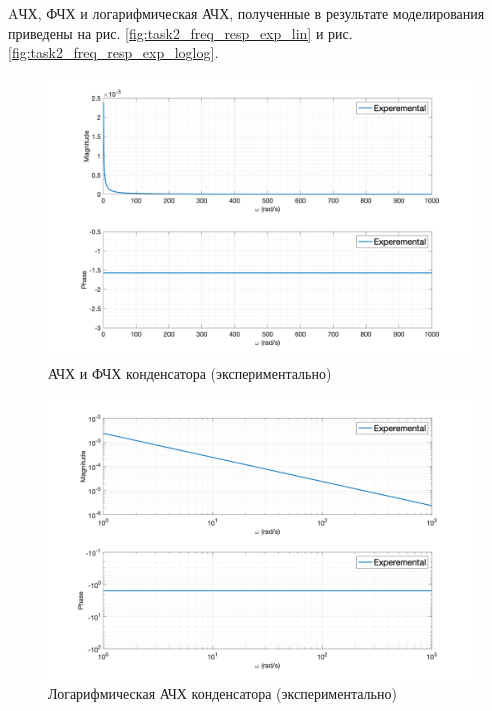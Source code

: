AЧХ, ФЧХ и логарифмическая АЧХ, полученные в результате моделирования приведены на рис. \ref{fig:task2_freq_resp_exp_lin} и рис. \ref{fig:task2_freq_resp_exp_loglog}.
\begin{figure}[ht!]
    \centering
    \includegraphics[width=\textwidth]{media/plots/task3_freq_resp_exp_lin.png}
    \caption{АЧХ и ФЧХ конденсатора (экспериментально)}
    \label{fig:task3_freq_resp_exp_lin}
\end{figure}
\begin{figure}[ht!]
    \centering
    \includegraphics[width=\textwidth]{media/plots/task3_freq_resp_exp_loglog.png}
    \caption{Логарифмическая АЧХ конденсатора (экспериментально)}
    \label{fig:task3_freq_resp_exp_loglog}
\end{figure}

